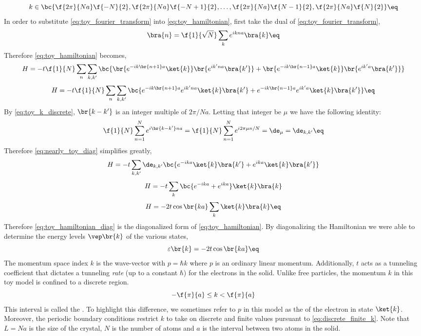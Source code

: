 \documentclass{article}
\begin{document}
\[ k \in \bc{\f{2\pi}{Na} \f{-N}{2}, \f{2\pi}{Na} \f{-N+1}{2},\ldots, \f{2\pi}{Na} \f{N-1}{2},\f{2\pi}{Na} \f{N}{2} } \eq \label{eq:discrete_finite_k} \]
In order to substitute \cref{eq:toy_fourier_transform} into \cref{eq:toy_hamiltonian}, first take the dual of \cref{eq:toy_fourier_transform},
\[ \bra{n} = \f{1}{\sqrt{N}} \sum_{k} e^{ikna} \bra{k} \eq \label{eq:dual_toy_fourier_transform} \]
Therefore \cref{eq:toy_hamiltonian} becomes,
\[ H = -t\f{1}{N} \sum_{n}\sum_{k,k'}\bc{\br{e^{-ik\br{n+1}a} \ket{k}}\br{e^{ik'na} \bra{k'}} + \br{e^{-ik\br{n-1}a} \ket{k}}\br{e^{ik'a} \bra{k'}}} \]
\[ H = -t\f{1}{N} \sum_{n}\sum_{k,k'}\bc{e^{-ik\br{n+1}a}e^{ik'na} \ket{k}\bra{k'} + e^{-ik\br{n-1}a}e^{ik'a} \ket{k}\bra{k'}} \eq \label{eq:nearly_toy_diag}\]
By \cref{eq:toy_k_discrete}, $\br{k - k'}$ is an integer multiple of $2 \pi / Na$. Letting that integer be $\mu$ we have the following identity:
\[ \f{1}{N} \sum_{n=1}^{N} e^{i\br{k - k'}na} = \f{1}{N} \sum_{n=1}^{N} e^{i2 \pi \mu n / N} = \de_{\mu} = \de_{k, k'}  \eq \label{eq:crucial_idenity}\]
Therefore \cref{eq:nearly_toy_diag} simplifies greatly,
\[ H = -t \sum_{k,k'} \de_{k,k'} \bc{e^{-ika} \ket{k}\bra{k'} + e^{ika} \ket{k}\bra{k'}} \]
\[ H = -t \sum_{k}\bc{e^{-ika} + e^{ika}} \ket{k}\bra{k} \]
\[ H = -2t\cos\br{ka} \sum_{k}\ket{k}\bra{k} \eq \label{eq:toy_hamiltonian_diag}\]
Therefore \cref{eq:toy_hamiltonian_diag} is the diagonalized form of \cref{eq:toy_hamiltonian}. By diagonalizing the Hamiltonian we were able to determine the energy levels $\vep\br{k}$ of the various states,
\[ \varepsilon\br{k} = - 2 t \cos\br{ka} \eq \label{eq:toy_single_energy_band}\]
The momentum space index $k$ is the wave-vector with $p = \hbar k$ where $p$ is an ordinary linear momentum. Additionally, $t$ acts as a tunneling coefficient that dictates a tunneling \textit{rate} (up to a constant $\hbar$) for the electrons in the solid. Unlike free particles, the momentum $k$ in this toy model is confined to a discrete region.
\[ -\f{\pi}{a} \leq k < \f{\pi}{a} \]
This interval is called the . To highlight this difference, we sometimes refer to $p$ in this model as the  of the electron in state $\ket{k}$.\\

Moreover, the periodic boundary conditions restrict $k$ to take on discrete and finite values pursuant to \cref{eq:discrete_finite_k}.
Note that $L = Na$ is the size of the crystal, $N$ is the number of atoms and $a$ is the interval between two atoms in the solid.\\
\end{document}
